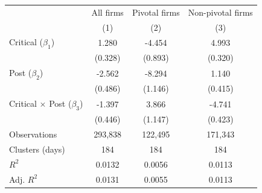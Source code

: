 \begin{tabular}{l c c c}
\toprule
 & All firms & Pivotal firms & Non-pivotal firms \\
 & (1) & (2) & (3) \\
\midrule

Critical ($\beta_1$)&       1.280\sym{***}&      -4.454\sym{***}&       4.993\sym{***}\\
                    &     (0.328)         &     (0.893)         &     (0.320)         \\
\addlinespace
Post ($\beta_2$)    &      -2.562\sym{***}&      -8.294\sym{***}&       1.140\sym{**} \\
                    &     (0.486)         &     (1.146)         &     (0.415)         \\
\addlinespace
Critical $\times$ Post ($\beta_3$)&      -1.397\sym{**} &       3.866\sym{***}&      -4.741\sym{***}\\
                    &     (0.446)         &     (1.147)         &     (0.423)         \\
\midrule
Observations        &     293,838         &     122,495         &     171,343         \\
Clusters (days)     &         184         &         184         &         184         \\
$R^2$               &      0.0132         &      0.0056         &      0.0113         \\
Adj. $R^2$          &      0.0131         &      0.0055         &      0.0113         \\
\bottomrule
\end{tabular}
